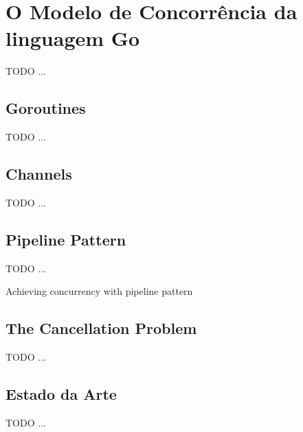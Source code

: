 \chapter{O Modelo de Concorrência da linguagem Go}
\label{cha:go_concurrency_model}

TODO ...

\section{Goroutines}
\label{sec:goroutines}

TODO ...

\section{Channels}
\label{sec:channels}

TODO ...

\section{Pipeline Pattern}
\label{sec:the_pipeline_pattern}

TODO ...

Achieving concurrency with pipeline pattern


\section{The Cancellation Problem}
\label{sec:the_cancellation_problem}

TODO ...

\section{Estado da Arte}
\label{sec:state_of_art}

TODO ...
